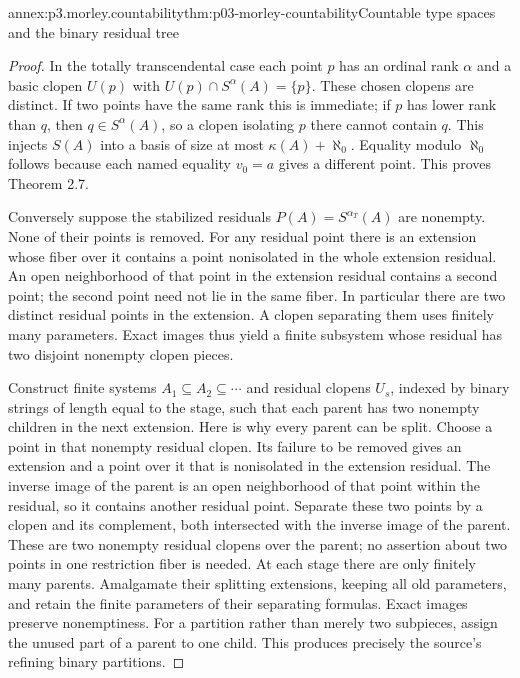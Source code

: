 \begin{annexitem}{annex:p3.morley.countability}{thm:p03-morley-countability}{Countable type spaces and the binary residual tree}
\begin{proof}
In the totally transcendental case each point \(p\) has an
ordinal rank \(\alpha\) and a basic clopen \(U(p)\) with
\(U(p)\cap S^\alpha(A)=\{p\}\). These chosen clopens are
distinct. If two points have the same rank this is immediate;
if \(p\) has lower rank than \(q\), then \(q\in S^\alpha(A)\),
so a clopen isolating \(p\) there cannot contain \(q\).
This injects \(S(A)\) into a basis of size at most
\(\kappa(A)+\aleph_0\). Equality modulo \(\aleph_0\)
follows because each named equality \(v_0=a\) gives a
different point. This proves Theorem 2.7.

Conversely suppose the stabilized residuals
\(P(A)=S^{\alpha_T}(A)\) are nonempty. None of their points
is removed. For any residual point there is an extension
whose fiber over it contains a point nonisolated in the
whole extension residual. An open neighborhood of that
point in the extension residual contains a second point;
the second point need not lie in the same fiber. In
particular there are two distinct residual points in the
extension. A clopen separating them uses finitely many
parameters. Exact images thus yield a finite subsystem
whose residual has two disjoint nonempty clopen pieces.

Construct finite systems \(A_1\subseteq A_2\subseteq\cdots\)
and residual clopens \(U_s\), indexed by binary strings of
length equal to the stage, such that each parent has two
nonempty children in the next extension. Here is why every
parent can be split. Choose a point in that nonempty residual
clopen. Its failure to be removed gives an extension and a
point over it that is nonisolated in the extension residual.
The inverse image of the parent is an open neighborhood
of that point within the residual, so it contains another
residual point. Separate these two points by a clopen and
its complement, both intersected with the inverse image
of the parent. These are two nonempty residual clopens
over the parent; no assertion about two points in one
restriction fiber is needed.
At each stage there are only finitely many parents.
Amalgamate their splitting extensions, keeping all old
parameters, and retain the finite parameters of their
separating formulas. Exact images preserve nonemptiness.
For a partition rather than merely two subpieces, assign
the unused part of a parent to one child. This produces
precisely the source's refining binary partitions.


\end{proof}
\end{annexitem}
